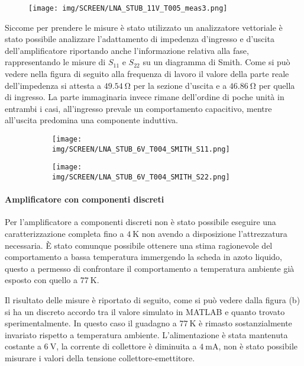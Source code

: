 \documentclass[12pt,oneside]{book}
\begin{document}
\begin{figure}[!htbp]
    \centering
        \texttt{[image: img/SCREEN/LNA\_STUB\_11V\_T005\_meas3.png]}
    \caption{}
\end{figure}

Siccome per prendere le misure è stato utilizzato un analizzatore vettoriale è stato possibile analizzare l'adattamento di impedenza d'ingresso e d'uscita dell'amplificatore riportando anche l'informazione relativa alla fase, rappresentando le misure di $S_{11}$ e $S_{22}$ su un diagramma di Smith.
Come si può vedere nella figura di seguito alla frequenza di lavoro il valore della parte reale dell'impedenza si attesta a $\SI{49.54}{\ohm}$ per la sezione d'uscita e a $\SI{46.86}{\ohm}$ per quella di ingresso. La parte immaginaria invece rimane dell'ordine di poche unità in entrambi i casi, all'ingresso prevale un comportamento capacitivo, mentre all'uscita predomina una componente induttiva.

\begin{figure}[!htbp]
    \centering
    \begin{subfigure}[t]{0.49\textwidth}
        \centering
        \texttt{[image: img/SCREEN/LNA\_STUB\_6V\_T004\_SMITH\_S11.png]}
        \caption{}
    \end{subfigure}
    \hfill
    \begin{subfigure}[t]{0.49\textwidth}
        \centering
        \texttt{[image: img/SCREEN/LNA\_STUB\_6V\_T004\_SMITH\_S22.png]}
        \caption{}
    \end{subfigure}
    \caption{}
    \hfill
\end{figure}

\paragraph{Amplificatore con componenti discreti}

Per l'amplificatore a componenti discreti non è stato possibile eseguire una caratterizzazione completa fino a $\SI{4}{\kelvin}$ non avendo a disposizione l'attrezzatura necessaria. È stato comunque possibile ottenere una stima ragionevole del comportamento a bassa temperatura immergendo la scheda in azoto liquido, questo a permesso di confrontare il comportamento a temperatura ambiente già esposto con quello a $\SI{77}{\kelvin}$.

Il risultato delle misure è riportato di seguito, come si può vedere dalla figura (b) si ha un discreto accordo tra il valore simulato in MATLAB e quanto trovato sperimentalmente. In questo caso il guadagno a $\SI{77}{\kelvin}$ è rimasto sostanzialmente invariato rispetto a temperatura ambiente. L'alimentazione è stata mantenuta costante a $\SI{6}{\volt}$, la corrente di collettore è diminuita a $\SI{4}{\milli\ampere}$, non è stato possibile misurare i valori della tensione collettore-emettitore.
\end{document}
